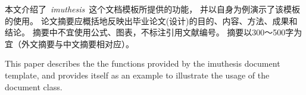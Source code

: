 \documentclass[hyperref]{imuthesis}
\begin{document}
	
	\maketitle
	
	\cleardoublepage
	\begin{cabstract}	%
		本文介绍了~\emph{imuthesis}~这个文档模板所提供的功能，
		并以自身为例演示了该模板的使用。
		论文摘要应概括地反映出毕业论文(设计)的目的、内容、方法、成果和结论。
		摘要中不宜使用公式、图表，不标注引用文献编号。
		摘要以300～500字为宜（外文摘要与中文摘要相对应）。

	\end{cabstract}
	
	\cleardoublepage
	\begin{eabstract}
		This paper describes the the functions provided by the imuthesis document template, 
		and provides itself as an example to illustrate the usage of the document class.

	\end{eabstract}
	
\end{document}
